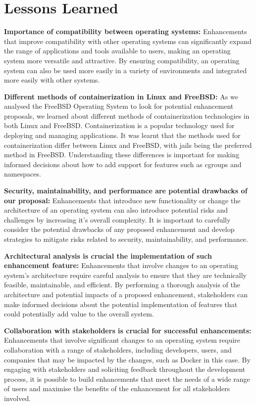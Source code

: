 \documentclass[12pt, dvipsnames, a4paper]{article}
\begin{document}
\section{Lessons Learned}

\textbf{Importance of compatibility between operating systems:}  Enhancements that improve compatibility with other operating systems can significantly expand the range of applications and tools available to users, making an operating system more versatile and attractive. By ensuring compatibility, an operating system can also be used more easily in a variety of environments and integrated more easily with other systems.

\textbf{Different methods of containerization in Linux and FreeBSD:} As we analysed the FreeBSD Operating System to look for potential enhancement proposals, we learned about different methods of containerization technologies in both Linux and FreeBSD. Containerization is a popular technology used for deploying and managing applications. It was learnt that the methods used for containerization differ between Linux and FreeBSD, with jails being the preferred method in FreeBSD. Understanding these differences is important for making informed decisions about how to add support for features such as cgroups and namespaces.

\textbf{Security, maintainability, and performance are potential drawbacks of our proposal:} Enhancements that introduce new functionality or change the architecture of an operating system can also introduce potential risks and challenges by increasing it’s overall complexity. It is important to carefully consider the potential drawbacks of any proposed enhancement and develop strategies to mitigate risks related to security, maintainability, and performance. 

\textbf{Architectural analysis is crucial the implementation of such enhancement feature:} Enhancements that involve changes to an operating system's architecture require careful analysis to ensure that they are technically feasible, maintainable, and efficient. By performing a thorough analysis of the architecture and potential impacts of a proposed enhancement, stakeholders can make informed decisions about the potential implementation of features that could potentially add value to the overall system.

\textbf{Collaboration with stakeholders is crucial for successful enhancements:} Enhancements that involve significant changes to an operating system require collaboration with a range of stakeholders, including developers, users, and companies that may be impacted by the changes, such as Docker in this case. By engaging with stakeholders and soliciting feedback throughout the development process, it is possible to build enhancements that meet the needs of a wide range of users and maximise the benefits of the enhancement for all stakeholders involved.
\end{document}
